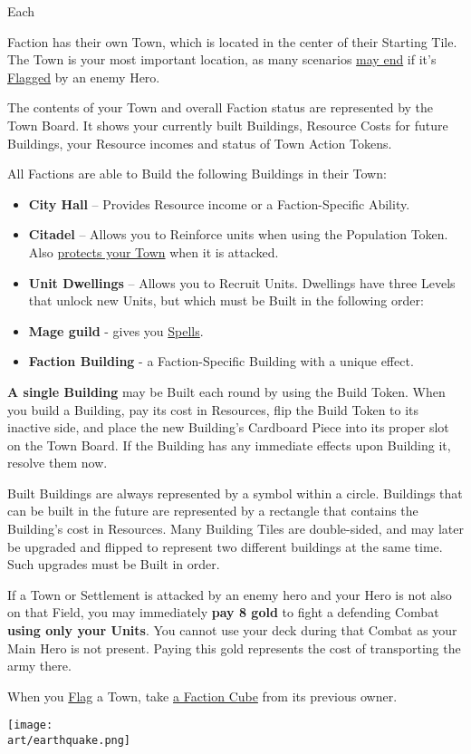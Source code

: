 
\begin{multicols*}{2}

\hypertarget{Town}{Each} Faction has their own Town, which is located in the center of their Starting Tile.
The Town is your most important location, as many scenarios \hyperlink{End}{may end} if it's \hyperlink{Categories}{Flagged} by an enemy Hero.\par
The contents of your Town and overall Faction status are represented by the Town Board.
It shows your currently built Buildings, Resource Costs for future Buildings, your Resource incomes and status of Town Action Tokens.\par
All Factions are able to Build the following Buildings in their Town:
\begin{itemize}
  \item \textbf{City Hall} – Provides Resource income or a Faction-Specific Ability.
  \item \textbf{Citadel} – Allows you to Reinforce units when using the Population Token.
Also \hyperlink{Walls}{protects your Town} when it is attacked.
  \item \textbf{Unit Dwellings} – Allows you to Recruit Units.
Dwellings have three Levels that unlock new Units, but which must be Built in the following order:
  \item \textbf{Mage guild} - gives you \hyperlink{spells}{Spells}.
  \item \textbf{Faction Building} - a Faction-Specific Building with a unique effect.
\end{itemize}
\textbf{A single Building} may be Built each round by using the Build Token.
When you build a Building, pay its cost in Resources, flip the Build Token to its inactive side, and place the new Building’s Cardboard Piece into its proper slot on the Town Board.
If the Building has any immediate effects upon Building it, resolve them now.\par
Built Buildings are always represented by a symbol within a circle.
Buildings that can be built in the future are represented by a rectangle that contains the Building's cost in Resources.
Many Building Tiles are double-sided, and may later be upgraded and flipped to represent two different buildings at the same time. Such upgrades must be Built in order.\par
If a Town or Settlement is attacked by an enemy hero and your Hero is not also on that Field, you may immediately \textbf{pay 8 gold} to fight a defending Combat \textbf{using only your Units}.
You cannot use your deck during that Combat as your Main Hero is not present.
Paying this gold represents the cost of transporting the army there.\par
When you \hyperlink{Categories}{Flag} a Town, take \hyperlink{End}{a Faction Cube} from its previous owner.

\vspace*{\fill}

\begin{center}
  \texttt{[image: \\art/earthquake.png]}
\end{center}

\vspace*{\fill}

\end{multicols*}
